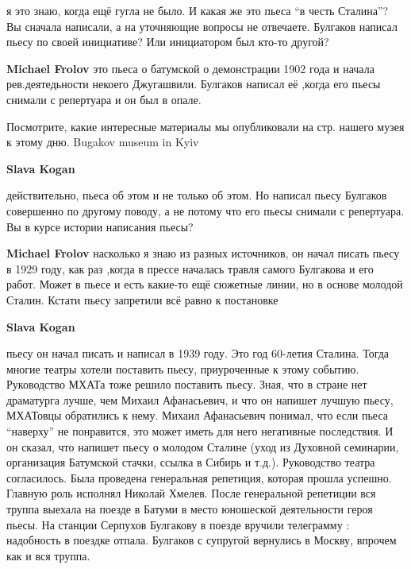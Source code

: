 \begin{itemize}
\begin{itemize}
я это знаю, когда ещё гугла не было. И какая же это пьеса \enquote{в честь Сталина}? Вы
сначала написали, а на уточняющие вопросы не отвечаете. Булгаков написал пьесу
по своей инициативе? Или инициатором был кто-то другой?

\begin{itemize} %
\textbf{Michael Frolov} это пьеса о батумской о демонстрации 1902 года и начала рев.деятедьности некоего Джугашвили. Булгаков написал её ,когда его пьесы снимали с репертуара и он был в опале.
\end{itemize} %


Посмотрите, какие интересные материалы мы опубликовали на стр. нашего музея к
этому дню. Bugakov museum in Kyiv


\textbf{Slava Kogan} 

действительно, пьеса об этом и не только об этом. Но написал пьесу Булгаков
совершенно по другому поводу, а не потому что его пьесы снимали с репертуара.
Вы в курсе истории написания пьесы?

\begin{itemize} %
\textbf{Michael Frolov} насколько я знаю из разных источников, он начал писать пьесу в 1929 году, как раз ,когда в прессе началась травля самого Булгакова и его работ. Может в пьесе и есть какие-то ещё сюжетные линии, но в основе молодой Сталин. Кстати пьесу запретили всё равно к постановке
\end{itemize} %

\textbf{Slava Kogan} 

пьесу он начал писать и написал в 1939 году. Это год 60-летия Сталина. Тогда
многие театры хотели поставить пьесу, приуроченные к этому событию. Руководство
МХАТа тоже решило поставить пьесу. Зная, что в стране нет драматурга лучше, чем
Михаил Афанасьевич, и что он напишет лучшую пьесу, МХАТовцы обратились к нему.
Михаил Афанасьевич понимал, что если пьеса \enquote{наверху} не понравится, это может
иметь для него негативные последствия. И он сказал, что напишет пьесу о молодом
Сталине (уход из Духовной семинарии, организация Батумской стачки, ссылка в
Сибирь и т.д.). Руководство театра согласилось. Была проведена генеральная
репетиция, которая прошла успешно. Главную роль исполнял Николай Хмелев. После
генеральной репетиции вся труппа выехала на поезде в Батуми в место юношеской
деятельности героя пьесы. На станции Серпухов Булгакову в поезде вручили
телеграмму : надобность в поездке отпала.  Булгаков с супругой вернулись в
Москву, впрочем как и вся труппа.


\end{itemize}
\end{itemize}
